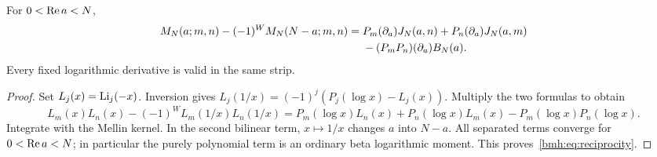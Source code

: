 \begin{theorem}\label{bmh:thm:reciprocity}
For $0<\operatorname{Re} a<N$,
\begin{align}
 M_N(a;m,n)-(-1)^W M_N(N-a;m,n)
 ={}&P_m(\partial_a)J_N(a,n)
    +P_n(\partial_a)J_N(a,m)\notag\\
 &-(P_mP_n)(\partial_a)B_N(a).
 \label{bmh:eq:reciprocity}
\end{align}
Every fixed logarithmic derivative is valid in the same strip.
\end{theorem}
\begin{proof}
Set $L_j(x)=\operatorname{Li}_j(-x)$. Inversion gives
$L_j(1/x)=(-1)^j(P_j(\log x)-L_j(x))$.
Multiply the two formulas to obtain
\[
 L_m(x)L_n(x)-(-1)^W L_m(1/x)L_n(1/x)
 =P_m(\log x)L_n(x)+P_n(\log x)L_m(x)-P_m(\log x)P_n(\log x).
\]
Integrate with the Mellin kernel. In the second bilinear term, $x\mapsto
1/x$ changes $a$ into $N-a$. All separated terms converge for
$0<\operatorname{Re} a<N$; in particular the purely polynomial term is an ordinary
beta logarithmic moment. This proves~\eqref{bmh:eq:reciprocity}.
\end{proof}

